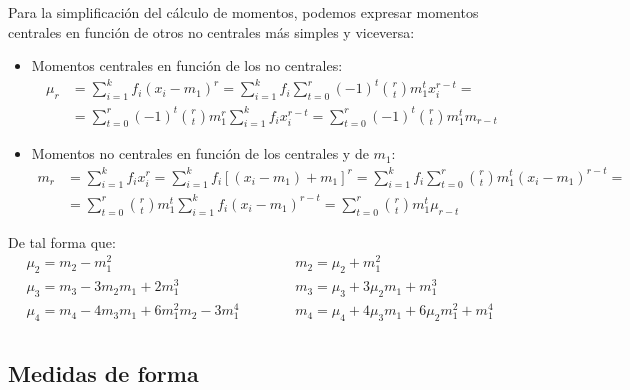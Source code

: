 Para la simplificación del cálculo de momentos, podemos expresar momentos centrales en función de otros
no centrales más simples y viceversa:

\begin{itemize}
    \item Momentos centrales en función de los no centrales:
    \begin{equation*}
        \begin{split}
            \mu_r &= \sum_{i=1}^k f_i (x_i - m_1)^r = \sum_{i=1}^k f_i \sum_{t=0}^r (-1)^t \binom{r}{t} m_1^t x_i^{r-t}=\\
            &=\sum_{t=0}^r(-1)^t \binom{r}{t}m_1^r \sum_{i=1}^k f_i x_i^{r-t}=\sum_{t=0}^r (-1)^t \binom{r}{t}m_1^t m_{r-t}
        \end{split}
    \end{equation*}
    

    \item Momentos no centrales en función de los centrales y de $m_1$:
    \begin{equation*}
        \begin{split}
            m_r &= \sum_{i=1}^k f_ix_i^r=\sum_{i=1}^kf_i [(x_i-m_1)+m_1]^r = \sum_{i=1}^k f_i \sum_{t=0}^r \binom{r}{t}m_1^t (x_i - m_1)^{r-t}=\\
            &=\sum_{t=0}^r \binom{r}{t} m_1^t \sum_{i=1}^k f_i (x_i - m_1)^{r-t}=\sum_{t=0}^r \binom{r}{t} m_1^t \mu_{r-t}
        \end{split}
    \end{equation*}
\end{itemize}

\noindent De tal forma que:
\begin{equation*}
    \begin{array}{lcl}
        \mu_2 = m_2 - m_1^2 & \hspace{1cm} & m_2 = \mu_2 + m_1^2\\
        \mu_3 = m_3 - 3m_2m_1 + 2m_1^3 & \hspace{1cm} & m_3 = \mu_3 + 3\mu_2 m_1 + m_1^3\\
        \mu_4 = m_4 - 4m_3m_1 + 6m_1^2m_2 - 3 m_1^4 & \hspace{1cm} & m_4 = \mu_4 + 4\mu_3 m_1 + 6\mu_2 m_1^2 + m_1^4\\
    \end{array}
\end{equation*}

\subsection{Medidas de forma}
